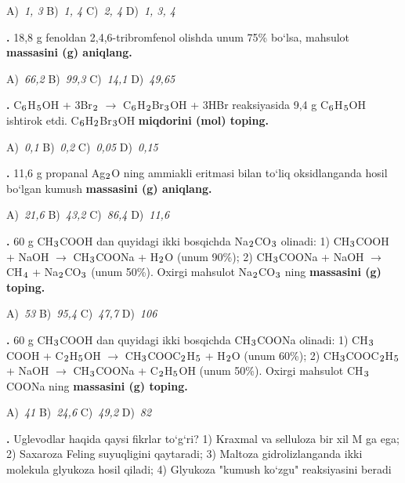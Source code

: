 \documentclass[11pt,a4paper]{article}
\renewcommand{\textsubscript}[1]{\ensuremath{_{\text{\fontsize{8}{8}\selectfont #1}}}}
\newcommand{\qn}[1]{\textbf{\fontsize{11.5}{13}\selectfont #1}}
\newcommand{\qsep}{\par\vspace{1pt}\noindent\rule{0pt}{0.4pt}\par\vspace{5pt}}
\begin{document}
\begin{multicols}{2}
\noindent A)~\textsl{1, 3} \hfill B)~\textsl{1, 4} \hfill C)~\textsl{2, 4} \hfill D)~\textsl{1, 3, 4}\par
\qsep
\noindent\qn{22.} 18,8 g fenoldan 2,4,6-tribromfenol olishda unum 75\% bo`lsa, mahsulot \textbf{massasini (g) aniqlang.}

\noindent A)~\textsl{66,2} \hfill B)~\textsl{99,3} \hfill C)~\textsl{14,1} \hfill D)~\textsl{49,65}\par
\qsep
\noindent\qn{23.} C\textsubscript{6}H\textsubscript{5}OH + 3Br\textsubscript{2} $\to$ C\textsubscript{6}H\textsubscript{2}Br\textsubscript{3}OH + 3HBr reaksiyasida 9,4 g C\textsubscript{6}H\textsubscript{5}OH ishtirok etdi. C\textsubscript{6}H\textsubscript{2}Br\textsubscript{3}OH \textbf{miqdorini (mol) toping.}

\noindent A)~\textsl{0,1} \hfill B)~\textsl{0,2} \hfill C)~\textsl{0,05} \hfill D)~\textsl{0,15}\par
\qsep
\noindent\qn{24.} 11,6 g propanal Ag\textsubscript{2}O ning ammiakli eritmasi bilan to`liq oksidlanganda hosil bo`lgan kumush \textbf{massasini (g) aniqlang.}

\noindent A)~\textsl{21,6} \hfill B)~\textsl{43,2} \hfill C)~\textsl{86,4} \hfill D)~\textsl{11,6}\par
\qsep
\noindent\qn{25.} 60 g CH\textsubscript{3}COOH dan quyidagi ikki bosqichda Na\textsubscript{2}CO\textsubscript{3} olinadi: 1) CH\textsubscript{3}COOH + NaOH $\to$ CH\textsubscript{3}COONa + H\textsubscript{2}O (unum 90\%); 2) CH\textsubscript{3}COONa + NaOH $\to$ CH\textsubscript{4} + Na\textsubscript{2}CO\textsubscript{3} (unum 50\%). Oxirgi mahsulot Na\textsubscript{2}CO\textsubscript{3} ning \textbf{massasini (g) toping.}

\noindent A)~\textsl{53} \hfill B)~\textsl{95,4} \hfill C)~\textsl{47,7} \hfill D)~\textsl{106}\par
\qsep
\noindent\qn{26.} 60 g CH\textsubscript{3}COOH dan quyidagi ikki bosqichda CH\textsubscript{3}COONa olinadi: 1) CH\textsubscript{3}COOH + C\textsubscript{2}H\textsubscript{5}OH $\to$ CH\textsubscript{3}COOC\textsubscript{2}H\textsubscript{5} + H\textsubscript{2}O (unum 60\%); 2) CH\textsubscript{3}COOC\textsubscript{2}H\textsubscript{5} + NaOH $\to$ CH\textsubscript{3}COONa + C\textsubscript{2}H\textsubscript{5}OH (unum 50\%). Oxirgi mahsulot CH\textsubscript{3}COONa ning \textbf{massasini (g) toping.}

\noindent A)~\textsl{41} \hfill B)~\textsl{24,6} \hfill C)~\textsl{49,2} \hfill D)~\textsl{82}\par
\qsep
\noindent\qn{27.} Uglevodlar haqida qaysi fikrlar to`g`ri? 1) Kraxmal va selluloza bir xil M ga ega; 2) Saxaroza Feling suyuqligini qaytaradi; 3) Maltoza gidrolizlanganda ikki molekula glyukoza hosil qiladi; 4) Glyukoza "kumush ko`zgu" reaksiyasini beradi


\end{multicols}
\end{document}
